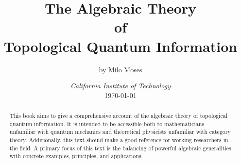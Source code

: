 \documentclass{article}
\title{The Algebraic Theory\\ of \\ Topological Quantum Information}
\author{by Milo Moses}
\date{\textit{California Institute of Technology} \\ [2ex] \today}
\theoremstyle{definition}
\numberwithin{figure}{section}
\begin{document}
\maketitle


\newcommand{\RR}{\mathbb{R}}
\newcommand{\SO}{\mathrm{SO}}
\newcommand{\marginfootnote}[1]{\marginpar{\footnotemark}\footnotetext{#1}}



\newcommand{\HH}{\mathbb{H}}
\newcommand{\NN}{\mathbb{N}}
\newcommand{\QQ}{\mathbb{Q}}
\newcommand{\CC}{\mathbb{C}}
\newcommand{\FF}{\mathbb{F}}
\newcommand{\ZZ}{\mathbb{Z}}
\newcommand{\Zcal}{\mathcal{Z}}
\newcommand{\Ncal}{\mathcal{N}}
\newcommand{\LL}{\mathscr{L}}
\newcommand{\TT}{\mathcal{T}}
\newcommand{\Ccat}{\mathscr{C}}
\newcommand{\Dcat}{\mathscr{D}}
\newcommand{\Ecat}{\mathscr{E}}
\newcommand{\st}{\,\,\mathrm{s.t.}\,\,}
\newcommand{\mm}{\mathfrak{m}}
\newcommand{\pp}{\mathfrak{p}}
\newcommand{\dd}{\bold{d}}
\newcommand{\Hom}{\mathrm{Hom}}
\newcommand{\Aut}{\mathrm{Aut}}
\newcommand{\Frac}{\mathrm{Frac}}
\newcommand{\tr}{\mathrm{tr}}
\newcommand{\op}{\mathrm{op}}
\newcommand{\res}{\mathrm{res}}
\newcommand{\im}{\mathrm{im}}
\newcommand{\ev}{\mathrm{ev}}
\newcommand{\coev}{\mathrm{coev}}
\newcommand{\id}{\mathrm{id}}
\newcommand{\coker}{\mathrm{coker}}
\newcommand{\SL}{\mathrm{SL}}
\newcommand{\End}{\mathrm{End}}
\newcommand{\Rep}{\bold{Rep}}
\newcommand{\Set}{\bold{Set}}
\newcommand{\Vecc}{\bold{Vec}}
\newcommand{\Top}{\bold{Top}}
\newcommand{\Grp}{\bold{Grp}}
\newcommand{\Hilb}{\bold{Hilb}}
\newcommand{\Bord}{\bold{Bord}}
\newcommand{\FPdim}{\mathrm{FPdim}}
\newcommand{\Cat}{\bold{Cat}}
\newcommand{\func}{\mathrm{func}}
\newcommand{\0}{\left|0\right>}
\newcommand{\1}{\left|1\right>}
\newcommand{\nullclass}{\left|\bold{0}\right>}
\newcommand{\alphaclass}{\left|\alpha\right>}
\newcommand{\betaclass}{\left|\beta\right>}
\newcommand{\alphabetaclass}{\left|\alpha\beta\right>}
\newcommand{\ppsi}{\left|\psi\right>}
\newcommand{\pphi}{\left|\phi\right>}
\newcommand{\bigleadsto}{\mathlarger{\mathlarger{\mathlarger{\leadsto}}}}
\newcommand{\vin}{\rotatebox[origin=c]{-90}{$\in$}}


\begin{abstract}
This book aims to give a comprehensive account of the algebraic theory of topological quantum information. It is intended to be accessible both to mathematicians unfamiliar with quantum mechanics and theoretical physicists unfamiliar with category theory. Additionally, this text should make a good reference for working researchers in the field. A primary focus of this text is the balancing of powerful algebraic generalities with concrete examples, principles, and applications.
\end{abstract}
\end{document}
